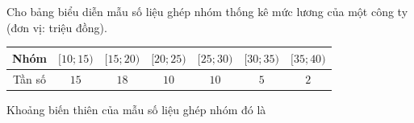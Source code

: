 \begin{bt}%

Cho bảng biểu diễn mẫu số liệu ghép nhóm thống kê mức lương của một công ty (đơn vị: triệu đồng).
\begin{center}\begin{tabular}{|c|c|c|c|c|c|c|}
			\hline Nhóm & $[10 ; 15)$ & $[15 ; 20)$ & $[20 ; 25)$ & $[25 ; 30)$ & $[30 ; 35)$ & $[35 ; 40)$  \\
			\hline Tần số & $15$ & $18$ & $10$ &$10$ &$5$ &$2$\\
			\hline
\end{tabular}\end{center}
Khoảng biến thiên của mẫu số liệu ghép nhóm đó là
\end{bt}

